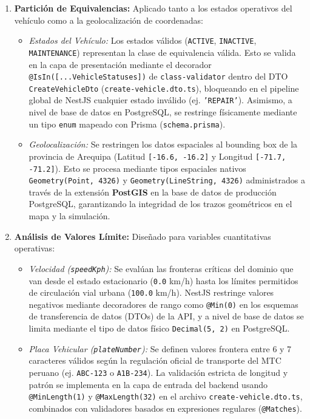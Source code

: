 \begin{enumerate}
    \item \textbf{Partición de Equivalencias:} Aplicado tanto a los estados operativos del vehículo como a la geolocalización de coordenadas:
    \begin{itemize}
        \item \textit{Estados del Vehículo:} Los estados válidos (\texttt{ACTIVE}, \texttt{INACTIVE}, \texttt{MAINTENANCE}) representan la clase de equivalencia válida. Esto se valida en la capa de presentación mediante el decorador \texttt{@IsIn([...VehicleStatuses])} de \texttt{class-validator} dentro del DTO \texttt{CreateVehicleDto} (\texttt{create-vehicle.dto.ts}), bloqueando en el pipeline global de NestJS cualquier estado inválido (ej. \texttt{'REPAIR'}). Asimismo, a nivel de base de datos en PostgreSQL, se restringe físicamente mediante un tipo \texttt{enum} mapeado con Prisma (\texttt{schema.prisma}).
        \item \textit{Geolocalización:} Se restringen los datos espaciales al bounding box de la provincia de Arequipa (Latitud \texttt{[-16.6, -16.2]} y Longitud \texttt{[-71.7, -71.2]}). Esto se procesa mediante tipos espaciales nativos \texttt{Geometry(Point, 4326)} y \texttt{Geometry(LineString, 4326)} administrados a través de la extensión \textbf{PostGIS} en la base de datos de producción PostgreSQL, garantizando la integridad de los trazos geométricos en el mapa y la simulación.
    \end{itemize}
    \item \textbf{Análisis de Valores Límite:} Diseñado para variables cuantitativas operativas:
    \begin{itemize}
        \item \textit{Velocidad (\texttt{speedKph}):} Se evalúan las fronteras críticas del dominio que van desde el estado estacionario (\texttt{0.0} km/h) hasta los límites permitidos de circulación vial urbana (\texttt{100.0} km/h). NestJS restringe valores negativos mediante decoradores de rango como \texttt{@Min(0)} en los esquemas de transferencia de datos (DTOs) de la API, y a nivel de base de datos se limita mediante el tipo de datos físico \texttt{Decimal(5, 2)} en PostgreSQL.
        \item \textit{Placa Vehicular (\texttt{plateNumber}):} Se definen valores frontera entre 6 y 7 caracteres válidos según la regulación oficial de transporte del MTC peruano (ej. \texttt{ABC-123} o \texttt{A1B-234}). La validación estricta de longitud y patrón se implementa en la capa de entrada del backend usando \texttt{@MinLength(1)} y \texttt{@MaxLength(32)} en el archivo \texttt{create-vehicle.dto.ts}, combinados con validadores basados en expresiones regulares (\texttt{@Matches}).

\end{itemize}
\end{enumerate}
